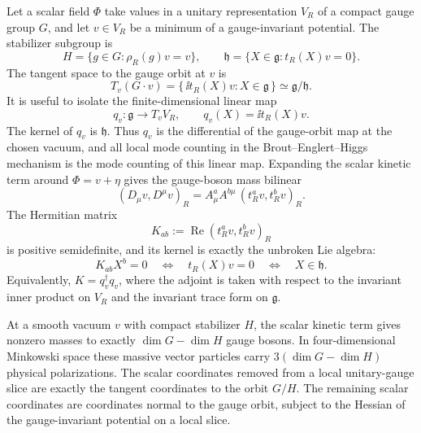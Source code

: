 Let a scalar field \(\Phi\) take values in a unitary representation \(V_R\) of
a compact gauge group \(G\), and let \(v\in V_R\) be a minimum of a
gauge-invariant potential.  The stabilizer subgroup is
\[
  H=\{g\in G:\rho_R(g)v=v\},
  \qquad
  \mathfrak h=\{X\in\mathfrak g:t_R(X)v=0\}.
\]
The tangent space to the gauge orbit at \(v\) is
\[
  T_v(G\cdot v)
  =
  \{\,\ii t_R(X)v:X\in\mathfrak g\,\}
  \simeq \mathfrak g/\mathfrak h .
\]
It is useful to isolate the finite-dimensional linear map
\begin{equation}
  q_v:\mathfrak g\longrightarrow T_vV_R,
  \qquad
  q_v(X)=\ii t_R(X)v .
  \label{eq:beh-orbit-differential}
\end{equation}
The kernel of \(q_v\) is \(\mathfrak h\).  Thus \(q_v\) is the differential
of the gauge-orbit map at the chosen vacuum, and all local mode counting in
the Brout--Englert--Higgs mechanism is the mode counting of this linear map.
Expanding the scalar kinetic term around \(\Phi=v+\eta\) gives the gauge-boson
mass bilinear
\begin{equation}
  (D_\mu v,D^\mu v)_R
  =
  A_\mu^aA^{b\mu}\,
  (t_R^a v,t_R^b v)_R .
  \label{eq:nonabelian-beh-mass-bilinear}
\end{equation}
The Hermitian matrix
\begin{equation}
  K_{ab}:=\operatorname{Re}(t_R^a v,t_R^b v)_R
  \label{eq:nonabelian-beh-K-matrix}
\end{equation}
is positive semidefinite, and its kernel is exactly the unbroken Lie algebra:
\[
  K_{ab}X^b=0
  \quad\Longleftrightarrow\quad
  t_R(X)v=0
  \quad\Longleftrightarrow\quad
  X\in\mathfrak h .
\]
Equivalently, \(K=q_v^\dagger q_v\), where the adjoint is taken with respect
to the invariant inner product on \(V_R\) and the invariant trace form on
\(\mathfrak g\).

\begin{proposition}
\label{prop:local-beh-mode-count}
At a smooth vacuum \(v\) with compact stabilizer \(H\), the scalar kinetic
term gives nonzero masses to exactly \(\dim G-\dim H\) gauge bosons.  In
four-dimensional Minkowski space these massive vector particles carry
\(3(\dim G-\dim H)\) physical polarizations.  The scalar coordinates removed
from a local unitary-gauge slice are exactly the tangent coordinates to the
orbit \(G/H\).  The remaining scalar coordinates are coordinates normal to the
gauge orbit, subject to the Hessian of the gauge-invariant potential on a
local slice.
\end{proposition}

